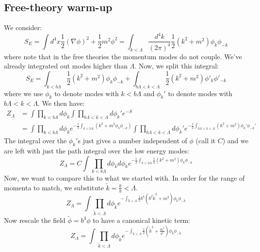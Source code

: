 \subsection{Free-theory warm-up}
We consider:
\begin{equation}
    S_E = \int d^4x \frac{1}{2}(\nabla \phi)^2 + \frac{1}{2}m^2\phi^2 = \int_{k < \Lambda} \frac{d^4k}{(2\pi)^4}\frac{1}{2}(k^2 + m^2)\phi_{k}\phi_{-k}
\end{equation}
where note that in the free theories the momentum modes do not couple. We've already integrated out modes higher than $\Lambda$. Now, we split this integral:
\begin{equation}
    S_E = \int_{k < b\Lambda}\frac{1}{2}(k^2 + m^2)\phi_k\phi_{-k} + \int_{b\Lambda < k < \Lambda}\frac{1}{2}(k^2 + m^2)\phi'_{k}\phi'_{-k}
\end{equation}
where we use $\phi_k$ to denote modes with $k < b\Lambda$ and $\phi_k'$ to denote modes with $b\Lambda < k < \Lambda$. We then have:
\begin{equation}
    \begin{split}
        Z_\Lambda &= \int \prod_{k < b\Lambda}d\phi_k \int \prod_{b \Lambda < k < \Lambda} d\phi_k' e^{-S}
        \\ &= \int \prod_{k < b\Lambda}d\phi_k e^{-\frac{1}{2}\int_{k < b\Lambda}(k^2 + m^2 \phi_k \phi_{-k})} \int \prod_{b\Lambda < k < \Lambda}d\phi_k' e^{-\frac{1}{2}\int_{b\Lambda < k < \Lambda}(k^2 + m^2)\phi_k'\phi_{-k}'}
    \end{split}
\end{equation}
The integral over the $\phi_k'$s just gives a number independent of $\phi$ (call it $C$) and we are left with just the path integral over the low energy modes:
\begin{equation}
    Z_\Lambda = C\int \prod_{k < b\Lambda}d\phi_k d\phi_k e^{-\frac{1}{2}\int_{k < b\Lambda}\frac{1}{2}(k^2 + m^2)\phi_k \phi_{-k}}
\end{equation}
Now, we want to compare this to what we started with. In order for the range of momenta to match, we substitute $\tilde{k} = \frac{k}{b} < \Lambda$.
\begin{equation}
    Z_\Lambda = \int \prod_{\tilde{k} < \Lambda}d\phi_{\tilde{k}} e^{-\int_{\tilde{k} < \Lambda}\frac{1}{2}b^4(b^2 \tilde{k}^2 + m^2)\phi_{\tilde{k}}\phi_{-\tilde{k}}}
\end{equation}
Now rescale the field $\tilde{\phi} = b^3\phi$ to have a canonical kinetic term:
\begin{equation}
    Z_{\Lambda} = \int \prod_{\tilde{k} < \Lambda}d\phi_{\tilde{k}} e^{-\int_{\tilde{k} < \Lambda}\frac{1}{2}(\tilde{k}^2 + \frac{m^2}{b^2})\phi_{\tilde{k}}\phi_{-\tilde{k}}}
\end{equation}
